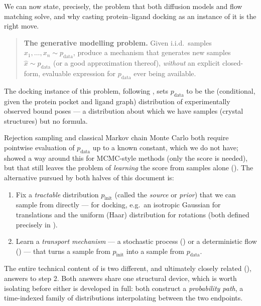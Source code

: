 \documentclass[11pt,a4paper]{report}
\theoremstyle{definition}
\theoremstyle{remark}
\begin{document}
We can now state, precisely, the problem that both diffusion models and
flow matching solve, and why casting protein--ligand docking as an instance
of it is the right move.

\begin{quote}
\textbf{The generative modelling problem.} Given i.i.d.\ samples
$x_1,\dots,x_n\sim p_{\mathrm{data}}$, produce a mechanism that generates new
samples $\hat x\sim p_{\mathrm{data}}$ (or a good approximation thereof),
\emph{without} an explicit closed-form, evaluable expression for
$p_{\mathrm{data}}$ ever being available.
\end{quote}

The docking instance of this problem, following , sets
$p_{\mathrm{data}}$ to be the (conditional, given the protein pocket and
ligand graph) distribution of experimentally observed bound poses --- a
distribution about which we have samples (crystal structures) but no
formula.

Rejection sampling and classical Markov chain Monte Carlo both require
pointwise evaluation of $p_{\mathrm{data}}$ up to a known constant, which we
do not have;  showed a way around this for MCMC-style
methods (only the score is needed), but that still leaves the problem of
\emph{learning} the score from samples alone
(). The alternative pursued by both halves of
this document is:
\begin{enumerate}
\item Fix a \emph{tractable} distribution $p_{\mathrm{init}}$ (called the
\emph{source} or \emph{prior}) that we can sample from directly --- for
docking, e.g.\ an isotropic Gaussian for translations and the uniform
(Haar) distribution for rotations (both defined precisely in
).
\item Learn a \emph{transport mechanism} --- a stochastic process
() or a deterministic flow ()
--- that turns a sample from $p_{\mathrm{init}}$ into a sample from
$p_{\mathrm{data}}$.
\end{enumerate}
The entire technical content of  is
two different, and ultimately closely related (), answers
to step 2. Both answers share one structural device, which is worth
isolating before either is developed in full: both construct a
\emph{probability path}, a time-indexed family of distributions
interpolating between the two endpoints.
\end{document}
